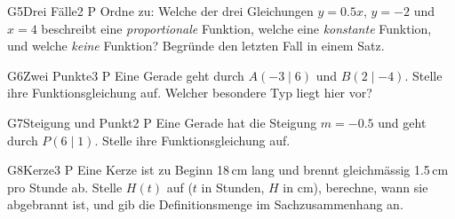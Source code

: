 \documentclass[11pt]{article}
\begin{document}
\begin{lpaufgabe}{G5}{Drei Fälle}{2 P}
Ordne zu: Welche der drei Gleichungen $y = 0.5x$, $y = -2$ und $x = 4$ beschreibt eine
\emph{proportionale} Funktion, welche eine \emph{konstante} Funktion, und welche \emph{keine} Funktion?
Begründe den letzten Fall in einem Satz.
\end{lpaufgabe}


\begin{lpaufgabe}{G6}{Zwei Punkte}{3 P}
Eine Gerade geht durch $A(-3 \mid 6)$ und $B(2 \mid -4)$. Stelle ihre Funktionsgleichung auf.
Welcher besondere Typ liegt hier vor?
\end{lpaufgabe}

\begin{lpaufgabe}{G7}{Steigung und Punkt}{2 P}
Eine Gerade hat die Steigung $m = -0.5$ und geht durch $P(6 \mid 1)$. Stelle ihre Funktionsgleichung auf.
\end{lpaufgabe}

\begin{lpaufgabe}{G8}{Kerze}{3 P}
Eine Kerze ist zu Beginn 18\,cm lang und brennt gleichmässig 1.5\,cm pro Stunde ab.
Stelle $H(t)$ auf ($t$ in Stunden, $H$ in cm), berechne, wann sie abgebrannt ist, und gib die
Definitionsmenge im Sachzusammenhang an.
\end{lpaufgabe}
\end{document}
